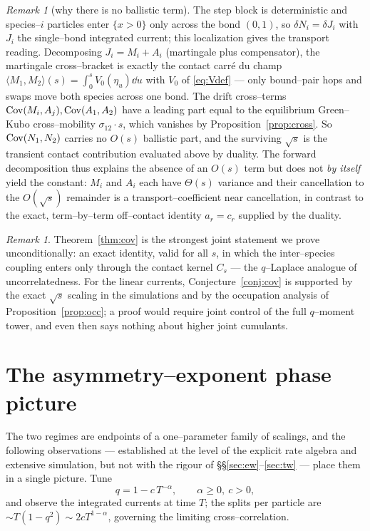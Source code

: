 \documentclass[11pt]{article}
\theoremstyle{plain}
\theoremstyle{definition}
\theoremstyle{remark}
\newtheorem{remark}[theorem]{Remark}
\begin{document}
\begin{remark}[why there is no ballistic term]\label{rem:noballistic}
The step block is deterministic and species--$i$ particles enter $\{x>0\}$ only across
the bond $(0,1)$, so $\delta N_i=\delta J_i$ with $J_i$ the single--bond integrated
current; this localization gives the transport reading. Decomposing
$J_i=M_i+A_i$ (martingale plus compensator), the martingale cross--bracket is exactly the
contact carr\'e du champ $\langle M_1,M_2\rangle(s)=\int_0^s V_0(\eta_u)\dd u$ with $V_0$
of \eqref{eq:Vdef} --- only bound--pair hops and swaps move both species across one bond.
The drift cross--terms $\operatorname{Cov}(M_i,A_j),\operatorname{Cov}(A_1,A_2)$ have a leading part equal to the
equilibrium Green--Kubo cross--mobility $\sigma_{12}\cdot s$, which vanishes by
Proposition~\ref{prop:cross}. So $\operatorname{Cov}(N_1,N_2)$ carries no $O(s)$ ballistic part, and
the surviving $\sqrt s$ is the transient contact contribution evaluated above by duality.
The forward decomposition thus explains the absence of an $O(s)$ term but does not
\emph{by itself} yield the constant: $M_i$ and $A_i$ each have $\Theta(s)$ variance and
their cancellation to the $O(\sqrt s)$ remainder is a transport--coefficient near
cancellation, in contrast to the exact, term--by--term off--contact identity
$a_r=c_r$ supplied by the duality.
\end{remark}

\begin{remark}\label{rem:uncorr}
Theorem~\ref{thm:cov} is the strongest joint statement we prove unconditionally: an
exact identity, valid for all $s$, in which the inter--species coupling enters only
through the contact kernel $C_s$ --- the $q$--Laplace analogue of uncorrelatedness.
For the linear currents, Conjecture~\ref{conj:cov} is supported by the exact
$\sqrt s$ scaling in the simulations and by the occupation analysis of
Proposition~\ref{prop:occ}; a proof would require joint control of the full
$q$--moment tower, and even then says nothing about higher joint cumulants.
\end{remark}

\section{The asymmetry--exponent phase picture}\label{sec:phase}

The two regimes are endpoints of a one--parameter family of scalings, and the
following observations --- established at the level of the explicit rate algebra and
extensive simulation, but not with the rigour of \S\S\ref{sec:ew}--\ref{sec:tw} --- place
them in a single picture. Tune
\begin{equation}\label{eq:alpha}
  q=1-c\,T^{-\alpha},\qquad \alpha\ge0,\ c>0,
\end{equation}
and observe the integrated currents at time $T$; the splits per particle are
$\sim T(1-q^2)\sim2cT^{1-\alpha}$, governing the limiting cross--correlation.
\end{document}
